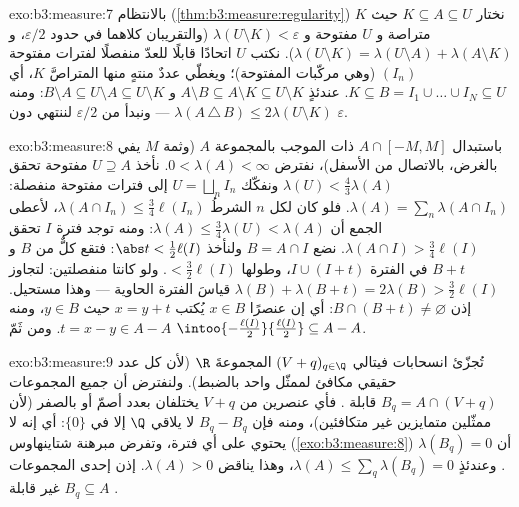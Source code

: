 \begin{solution}{exo:b3:measure:7}
بالانتظام (\cref{thm:b3:measure:regularity}) نختار $K
\subseteq A \subseteq U$ حيث $K$ متراصة و $U$ مفتوحة
و $\lambda(U\setminus K) < \varepsilon$ (والتقريبان كلاهما في حدود $\varepsilon/2$، و $\lambda(U \setminus K) =
\lambda(U\setminus A) + \lambda(A \setminus K)$).
نكتب $U$ اتحادًا قابلًا للعدّ منفصلًا لفترات مفتوحة $(I_n)$ (وهي
مركّبات المفتوحة)؛ ويغطّي عددٌ منتهٍ منها المتراصَّ $K$، أي
$K \subseteq B = I_1\cup\dots\cup I_N \subseteq
U$. عندئذٍ $A \setminus B \subseteq A\setminus K \subseteq
U\setminus K$ و $B \setminus A \subseteq U \setminus A
\subseteq U\setminus K$: ومنه $\lambda(A\,\triangle\,B) \leq 2\lambda(U\setminus K)$ --- ونبدأ من
$\varepsilon/2$ لننتهي دون $\varepsilon$.
\end{solution}

\begin{solution}{exo:b3:measure:8}
باستبدال $A \cap [-M, M]$ ذات  الموجب بالمجموعة $A$ (وثمة
$M$ يفي بالغرض، بالاتصال من الأسفل)، نفترض $0 < \lambda(A) <
\infty$. نأخذ
$U \supseteq A$ مفتوحة تحقق $\lambda(U) <
\frac43\lambda(A)$ ونفكّك $U = \bigsqcup_nI_n$ إلى فترات
مفتوحة منفصلة: $\lambda(A) = \sum_n\lambda(A\cap
I_n)$. فلو كان لكل $n$ الشرطُ $\lambda(A\cap I_n) \leq
\frac34\ell(I_n)$، لأعطى
الجمع أن $\lambda(A) \leq
\frac34\lambda(U) < \lambda(A)$: ومنه توجد فترة $I$ تحقق $\lambda(A\cap I) > \frac34\ell(I)$. نضع
$B = A \cap I$ ولنأخذ $\abs t < \frac12\ell(I)$: فتقع كلٌّ من $B$ و $B + t$ في
الفترة $I \cup (I + t)$، وطولها $< \frac32\ell(I)$. ولو كانتا منفصلتين:
لتجاوز $\lambda(B) + \lambda(B + t) = 2\lambda(B)
> \frac32\ell(I)$ قياسَ الفترة الحاوية --- وهذا مستحيل. إذن $B \cap (B + t) \neq \varnothing$:
أي إن عنصرًا $x \in B$ يُكتب $x = y + t$ حيث $y \in B$، ومنه
$t = x -
y \in A - A$. ومن ثَمّ $\intoo{-\frac{\ell(I)}2}{\frac{\ell(I)}2} \subseteq A -
A$.
\end{solution}

\begin{solution}{exo:b3:measure:9}
تُجزّئ انسحابات فيتالي $(V + q)_{q\in\Q}$ المجموعةَ $\R$ (لأن كل عدد حقيقي
مكافئ لممثّل واحد بالضبط). ولنفترض أن جميع المجموعات $B_q = A \cap (V + q)$
قابلة . فأي عنصرين من $V + q$ يختلفان بعدد أصمّ أو
بالصفر (لأن ممثّلين متمايزين غير متكافئين)، ومنه فإن $B_q - B_q$
لا يلاقي $\Q$ إلا في $\{0\}$: أي إنه لا يحتوي على أي فترة، وتفرض
مبرهنة شتاينهاوس (\cref{exo:b3:measure:8}) أن $\lambda(B_q) = 0$. وعندئذٍ $\lambda(A) \leq \sum_{q}\lambda(B_q) = 0$، وهذا
يناقض $\lambda(A) > 0$. إذن إحدى المجموعات $B_q \subseteq A$ غير قابلة
.
\end{solution}

